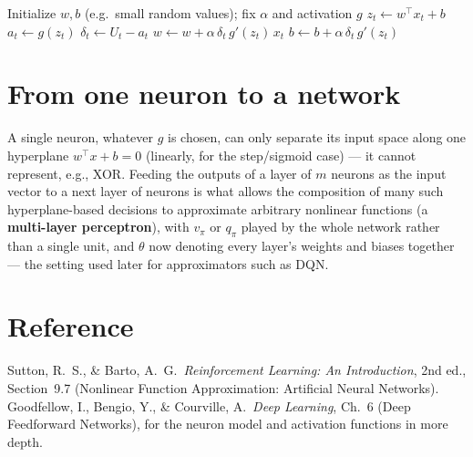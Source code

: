 \documentclass[11pt]{article}
\begin{document}
\begin{algorithm}[h]
\caption{SGD training of a single neuron}
\begin{algorithmic}[1]
\State Initialize $w, b$ (e.g.\ small random values); fix $\alpha$ and activation $g$
    \State $z_t \leftarrow w^\top x_t + b$
    \State $a_t \leftarrow g(z_t)$
    \State $\delta_t \leftarrow U_t - a_t$
    \State $w \leftarrow w + \alpha\, \delta_t\, g'(z_t)\, x_t$
    \State $b \leftarrow b + \alpha\, \delta_t\, g'(z_t)$
\EndFor
\end{algorithmic}
\end{algorithm}

\section{From one neuron to a network}

A single neuron, whatever $g$ is chosen, can only separate its input space
along one hyperplane $w^\top x + b = 0$ (linearly, for the step/sigmoid
case) — it cannot represent, e.g., XOR. Feeding the outputs of a layer of
$m$ neurons as the input vector to a next layer of neurons is what allows
the composition of many such hyperplane-based decisions to approximate
arbitrary nonlinear functions (a \textbf{multi-layer perceptron}), with
$v_\pi$ or $q_\pi$ played by the whole network rather than a single unit,
and $\theta$ now denoting every layer's weights and biases together — the
setting used later for approximators such as DQN.

\section{Reference}

Sutton, R.\ S., \& Barto, A.\ G.\ \emph{Reinforcement Learning: An
Introduction}, 2nd ed., Section~9.7 (Nonlinear Function Approximation:
Artificial Neural Networks). Goodfellow, I., Bengio, Y., \& Courville, A.\
\emph{Deep Learning}, Ch.~6 (Deep Feedforward Networks), for the neuron
model and activation functions in more depth.
\end{document}
